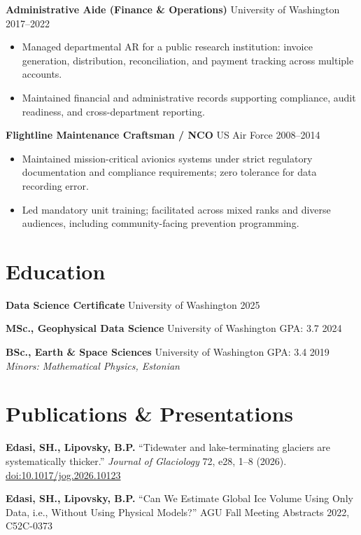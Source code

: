 \documentclass[11pt,a4paper]{article}
\begin{document}
\vspace{0.2cm}
\noindent
\textbf{Administrative Aide (Finance \& Operations)} \hfill University of Washington \hfill 2017--2022
\begin{itemize}
    \item Managed departmental AR for a public research institution: invoice generation, distribution, reconciliation, and payment tracking across multiple accounts.
    \item Maintained financial and administrative records supporting compliance, audit readiness, and cross-department reporting.
\end{itemize}

\vspace{0.2cm}
\noindent
\textbf{Flightline Maintenance Craftsman / NCO} \hfill US Air Force \hfill 2008--2014
\begin{itemize}
    \item Maintained mission-critical avionics systems under strict regulatory documentation and compliance requirements; zero tolerance for data recording error.
    \item Led mandatory unit training; facilitated across mixed ranks and diverse audiences, including community-facing prevention programming.
\end{itemize}

\section*{Education}

\noindent
\textbf{Data Science Certificate} \hfill University of Washington \hfill 2025

\vspace{0.1cm}
\noindent
\textbf{MSc., Geophysical Data Science} \hfill University of Washington \hfill GPA: 3.7 \hfill 2024

\vspace{0.1cm}
\noindent
\textbf{BSc., Earth \& Space Sciences} \hfill University of Washington \hfill GPA: 3.4 \hfill 2019 \\
\textit{Minors: Mathematical Physics, Estonian}

\section*{Publications \& Presentations}

\noindent
\textbf{Edasi, SH., Lipovsky, B.P.} ``Tidewater and lake-terminating glaciers are systematically thicker.'' \textit{Journal of Glaciology} 72, e28, 1--8 (2026). \href{https://doi.org/10.1017/jog.2026.10123}{doi:10.1017/jog.2026.10123}

\noindent
\textbf{Edasi, SH., Lipovsky, B.P.} ``Can We Estimate Global Ice Volume Using Only Data, i.e., Without Using Physical Models?'' AGU Fall Meeting Abstracts 2022, C52C-0373
\end{document}
